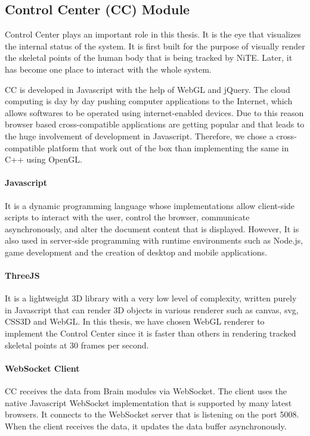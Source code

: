 \subsection{Control Center (CC) Module} Control Center plays an important role in this thesis. It is the eye that visualizes the internal status of the system. It is first built for the purpose of visually render the skeletal points of the human body that is being tracked by NiTE. Later, it has become one place to interact with the whole system. 

CC is developed in Javascript with the help of WebGL and jQuery. The cloud computing is day by day pushing computer applications to the Internet, which allows softwares to be operated using internet-enabled devices. Due to this reason browser based cross-compatible applications are getting popular and that leads to the huge involvement of development in Javascript. Therefore, we chose a cross-compatible platform that work out of the box than implementing the same in C++ using OpenGL.



\paragraph*{Javascript} It is a dynamic programming language whose implementations allow client-side scripts to interact with the user, control the browser, communicate asynchronously, and alter the document content that is displayed. However, It is also used in server-side programming with runtime environments such as Node.js, game development and the creation of desktop and mobile applications.

\paragraph*{ThreeJS} It is a lightweight 3D library with a very low level of complexity, written purely in Javascript that can render 3D objects in various renderer such as canvas, svg, CSS3D and WebGL. In this thesis, we have chosen WebGL renderer to implement the Control Center since it is faster than others in rendering tracked skeletal points at 30 frames per second.

\paragraph*{WebSocket Client} CC receives the data from Brain modules via WebSocket. The client uses the native Javascript WebSocket implementation that is supported by many latest browsers. It connects to the WebSocket server that is listening on the port 5008. When the client receives the data, it updates the data buffer asynchronously.

